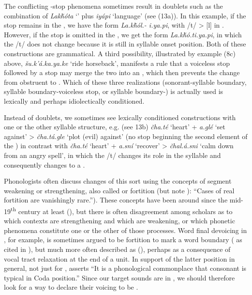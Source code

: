\documentclass[output=paper]{LSP/langsci}
\begin{document}
The conflicting -stop phenomena sometimes result in doublets such as the combination of \textit{Lak\v{h}\'ota} `' plus \textit{iyápi} `language' (see (13a)). In this example, if the  stop remains in the , we have the form \textit{La.k\v{h}\'ol.- i.ya.pi}, with /t/ > [l] in . However, if the  stop is omitted in the , we get the form \textit{La.k\v{h}\'o.ti.ya.pi}, in which the /t/ does not change because it is still in syllable onset position. Both of these constructions are grammatical. A third possibility, illustrated by example (8c) above, \textit{\v{s}u.k'á.ka.ya.ke} `ride horseback', manifests a rule that a voiceless stop followed by a  stop may merge the two into an , which then prevents the change from obstruent to . Which of these three realizations (sonorant-syllable boundary, syllable boundary-voiceless stop, or syllable boundary-) is actually used is lexically and perhaps idiolectically conditioned.

Instead of doublets, we sometimes see lexically conditioned constructions with one or the other syllable structure, e.g. (see 13b) \textit{\v{c}ha.té} `heart' + \textit{a.glé} `set against' > \textit{\v{c}ha.tá.gle} `plot (evil) against' (no  stop beginning the second element of the ) in contrast with \textit{\v{c}ha.té} `heart' + \textit{a.sní} `recover' > \textit{\v{c}hal.á.sni} `calm down from an angry spell', in which the /t/ changes its role in the syllable and consequently changes to a .

Phonologists often discuss changes of this sort using the concepts of segment weakening or strengthening, also called  or fortition (but note \citealt[10]{Honeybone2008}): ``Cases of real fortition are vanishingly rare.''). These concepts have been around since the mid-19\textsuperscript{th} century at least (\citealt{Honeybone2008}), but there is often disagreement among scholars as to which contexts are strengthening and which are weakening, or which phonetic phenomena constitute one or the other of those processes. Word final devoicing in , for example, is sometimes argued to be fortition to mark a word boundary (\citealt{IversonSalmons2007} as cited in \citealt{Harris2009}), but much more often described as  (\citealt{Harris2009}), perhaps as a consequence of vocal tract relaxation at the end of a unit. In support of the latter position in general, not just for , \citet[112]{Szigetvari2008} asserts ``It is a phonological commonplace that consonant  is typical in Coda position.'' Since our target sounds are in , we should therefore look for a way to declare their voicing to be .
\end{document}
